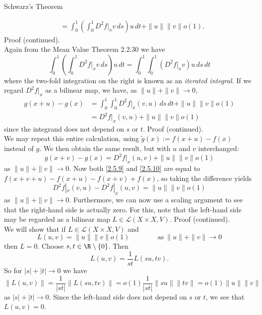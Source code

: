 \documentclass[smaller,hyperref={CJKbookmarks=true}]{beamer}
\begin{document}
\begin{frame}{Schwarz's Theorem}
\begin{spacing}{1}
\begin{equation*}
\begin{split}
       &=\int_{0}^{1}\left(\int_{0}^{1}D^2f|_xv\,ds\right)u\,dt+\|u\|\|v\|o(1).
  \end{split}
\end{equation*}
\newpage
\alert{Proof (continued).}\\
Again from the Mean Value Theorem 2.2.30 we have
\[\int_{0}^{1}\left(\int_{0}^{1}D^2f|_xv\,ds\right)u\,dt=
\int_{0}^{1}\int_{0}^{1}\left(D^2f|_xv\right)u\,ds\,dt\]
where the two-fold integration on the right is known as an \emph{iterated
integral.} If we regard $D^2f|_x$ as a bilinear map, we have, as $\|u\|+\|v\|\to0$,
\begin{equation}\label{2.5.9}
 \begin{split}
    g(x+u)-g(x) &=\int_{0}^{1}\int_{0}^{1}D^2f|_x(v,u)\,ds\,dt+\|u\|\|v\|o(1) \\
      &=D^2f|_x(v,u)+\|u\|\|v\|o(1)
 \end{split}
\end{equation}
since the integrand does not depend on $s$ or $t$.
\newpage
\alert{Proof (continued).}\\
We may repeat this entire calculation, using $\widetilde{g}(x):=f(x+u)-f(x)$ instead of $g$. We then obtain the same result, but with $u$ and $v$
interchanged:
\begin{equation}\label{2.5.10}
  g(x+v)-g(x)=D^2f|_x(u,v)+\|u\|\|v\|o(1)
\end{equation}
as $\|u\|+\|v\|\to0$. Now both \eqref{2.5.9} and \eqref{2.5.10} are equal to $f(x+v+u)-f(x+u)-f(x+v)+f(x)$, so taking the dif{}ference yields
\[D^2f|_x(v,u)-D^2f|_x(u,v)=\|u\|\|v\|o(1)\]
as $\|u\|+\|v\|\to0$. Furthermore, we can now use a scaling argument to see
that the right-hand side is actually zero. For this, note that the left-hand
side may be regarded as a bilinear map $L\in\mathcal{L}(X\times X,V)$.
\newpage
\alert{Proof (continued).}\\
We will show that if $L\in\mathcal{L}(X\times X,V)$ and
\[L(u,v)=\|u\|\|v\|o(1)\qquad\qquad
\text{as}~\|u\|+\|v\|\to0\]
then $L=0$. Choose $s,t\in\R\setminus\{0\}$. Then
\[L(u,v)=\frac{1}{st}L(su,tv).\]
So for $|s|+|t|\to0$ we have
\[\|L(u,v)\|=\frac{1}{|st|}\|L(su,tv)\|=o(1)
\frac{1}{|st|}\|su\|\|tv\|=o(1)\|u\|\|v\|\]
as $|s|+|t|\to0$. Since the left-hand side does not depend on $s$ or $t$, we see that $L(u,v)=0$.
\end{spacing}
\end{frame}
\end{document}
